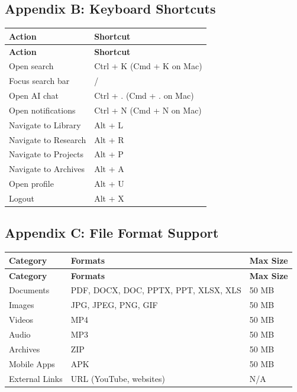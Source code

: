 \documentclass[12pt,a4paper]{article}
\begin{document}
\subsection{Appendix B: Keyboard Shortcuts}

\begin{longtable}{|l|l|}
\hline
\textbf{Action} & \textbf{Shortcut} \\
\hline
\endfirsthead
\hline
\textbf{Action} & \textbf{Shortcut} \\
\hline
\endhead
\hline
\endfoot
Open search & Ctrl + K (Cmd + K on Mac) \\
\hline
Focus search bar & / \\
\hline
Open AI chat & Ctrl + . (Cmd + . on Mac) \\
\hline
Open notifications & Ctrl + N (Cmd + N on Mac) \\
\hline
Navigate to Library & Alt + L \\
\hline
Navigate to Research & Alt + R \\
\hline
Navigate to Projects & Alt + P \\
\hline
Navigate to Archives & Alt + A \\
\hline
Open profile & Alt + U \\
\hline
Logout & Alt + X \\
\hline
\end{longtable}

\subsection{Appendix C: File Format Support}

\begin{longtable}{|l|l|l|}
\hline
\textbf{Category} & \textbf{Formats} & \textbf{Max Size} \\
\hline
\endfirsthead
\hline
\textbf{Category} & \textbf{Formats} & \textbf{Max Size} \\
\hline
\endhead
\hline
\endfoot
Documents & PDF, DOCX, DOC, PPTX, PPT, XLSX, XLS & 50 MB \\
\hline
Images & JPG, JPEG, PNG, GIF & 50 MB \\
\hline
Videos & MP4 & 50 MB \\
\hline
Audio & MP3 & 50 MB \\
\hline
Archives & ZIP & 50 MB \\
\hline
Mobile Apps & APK & 50 MB \\
\hline
External Links & URL (YouTube, websites) & N/A \\
\hline
\end{longtable}
\end{document}
